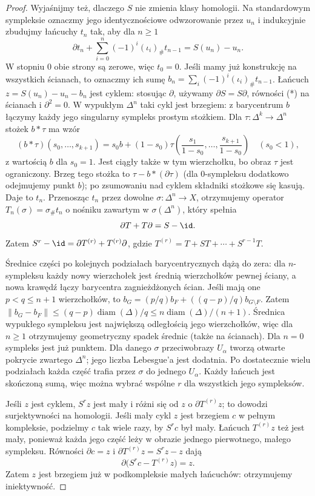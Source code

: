 \begin{proof}
Wyjaśnijmy też, dlaczego $S$ nie zmienia
klasy homologii. Na standardowym sympleksie
oznaczmy jego identycznościowe odwzorowanie
przez $u_n$ i indukcyjnie zbudujmy
łańcuchy $t_n$ tak, aby dla $n\geq1$
\[
 \partial t_n+\sum_{i=0}^n(-1)^i(\iota_i)_\#t_{n-1}
       =S(u_n)-u_n. \tag{*}
\]
W stopniu $0$ obie strony są zerowe,
więc $t_0=0$. Jeśli mamy już konstrukcję
na wszystkich ścianach, to oznaczmy ich sumę
$b_n=\sum_i(-1)^i(\iota_i)_\#t_{n-1}$.
Łańcuch $z=S(u_n)-u_n-b_n$
jest cyklem: stosując $\partial$,
używamy $\partial S=S\partial$,
równości (*) na ścianach
i $\partial^2=0$.
W wypukłym $\Delta^n$ taki cykl jest
brzegiem: z barycentrum $b$ łączymy
każdy jego singularny sympleks prostym
stożkiem. Dla $\tau:\Delta^k\to\Delta^n$ stożek $b*\tau$
ma wzór
\[
 (b*\tau)(s_0,\ldots,s_{k+1})
 =s_0b+(1-s_0)\tau\left(\frac{s_1}{1-s_0},\ldots,
                         \frac{s_{k+1}}{1-s_0}\right)
 \quad(s_0<1),
\]
z wartością $b$ dla $s_0=1$. Jest ciągły także w tym wierzchołku,
bo obraz $\tau$ jest ograniczony. Brzeg tego stożka to
$\tau-b*(\partial\tau)$ (dla $0$-sympleksu
dodatkowo odejmujemy punkt $b$);
po zsumowaniu nad cyklem składniki
stożkowe się kasują. Daje to $t_n$.
Przenosząc $t_n$ przez dowolne
$\sigma:\Delta^n\to X$, otrzymujemy
operator $T_n(\sigma)=\sigma_\#t_n$ o nośniku zawartym
w $\sigma(\Delta^n)$, który spełnia
\[
 \partial T+T\partial=S-\id.
\]
Zatem $S^r-\id=\partial T^{(r)}+
T^{(r)}\partial$, gdzie
$T^{(r)}=T+ST+\cdots+S^{r-1}T$.

Średnice części po kolejnych podziałach
barycentrycznych dążą do zera: dla
$n$-sympleksu każdy nowy wierzchołek
jest średnią wierzchołków pewnej ściany,
a nowa krawędź łączy barycentra zagnieżdżonych ścian.
Jeśli mają one $p<q\leq n+1$ wierzchołków, to
$b_G=(p/q)b_F+((q-p)/q)b_{G\setminus F}$.
Zatem $\|b_G-b_F\|\leq(q-p)\operatorname{diam}(\Delta)/q
\leq n\operatorname{diam}(\Delta)/(n+1)$.
Średnica wypukłego sympleksu jest największą odległością jego
wierzchołków, więc dla $n\geq1$ otrzymujemy geometryczny spadek
średnic (także na ścianach). Dla $n=0$ sympleks jest już punktem. Dla danego $\sigma$
przeciwobrazy $U_\alpha$ tworzą
otwarte pokrycie zwartego $\Delta^n$;
jego liczba Lebesgue'a jest dodatnia.
Po dostatecznie wielu podziałach
każda część trafia przez $\sigma$
do jednego $U_\alpha$.
Każdy łańcuch jest skończoną sumą,
więc można wybrać wspólne $r$
dla wszystkich jego sympleksów.

Jeśli $z$ jest cyklem, $S^rz$
jest mały i różni się od $z$
o $\partial T^{(r)}z$; to dowodzi
surjektywności na homologii.
Jeśli mały cykl $z$ jest brzegiem
$c$ w pełnym kompleksie, podzielmy
$c$ tak wiele razy, by $S^rc$
był mały. Łańcuch $T^{(r)}z$
też jest mały, ponieważ każda
jego część leży w obrazie
jednego pierwotnego, małego sympleksu.
Równości $\partial c=z$ i
$\partial T^{(r)}z=S^rz-z$ dają
\[
 \partial\bigl(S^rc-T^{(r)}z\bigr)=z.
\]
Zatem $z$ jest brzegiem już
w podkompleksie małych łańcuchów:
otrzymujemy iniektywność.
\end{proof}

